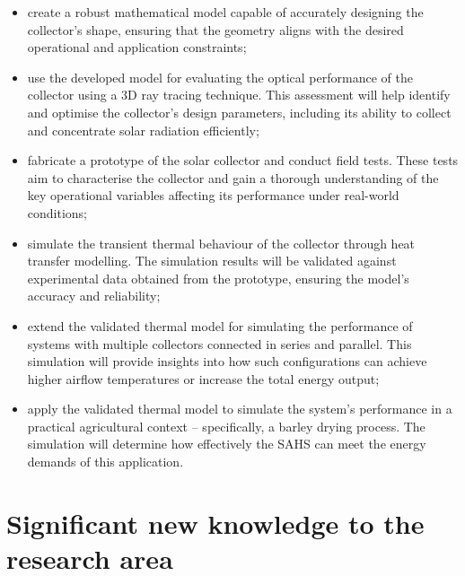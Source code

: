 \begin{itemize}
	\item create a robust mathematical model capable of accurately designing the collector's shape, ensuring that the geometry aligns with the desired operational and application constraints;
	\item use the developed model for evaluating the optical performance of the collector using a 3D ray tracing technique. This assessment will help identify and optimise the collector’s design parameters, including its ability to collect and concentrate solar radiation efficiently;
	\item fabricate a prototype of the solar collector and conduct field tests. These tests aim to characterise the collector and gain a thorough understanding of the key operational variables affecting its performance under real-world conditions;
	\item simulate the transient thermal behaviour of the collector through heat transfer modelling. The simulation results will be validated against experimental data obtained from the prototype, ensuring the model’s accuracy and reliability;
	\item extend the validated thermal model for simulating the performance of systems with multiple collectors connected in series and parallel. This simulation will provide insights into how such configurations can achieve higher airflow temperatures or increase the total energy output;
	\item apply the validated thermal model to simulate the system’s performance in a practical agricultural context -- specifically, a barley drying process. The simulation will determine how effectively the SAHS can meet the energy demands of this application.

\end{itemize}

\section{Significant new knowledge to the research area}

